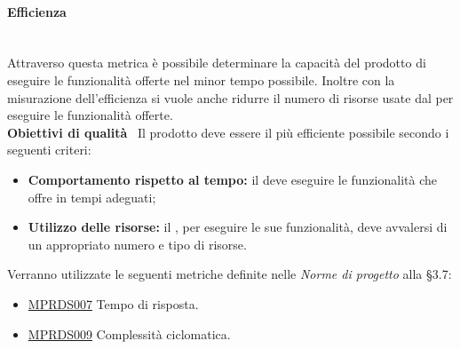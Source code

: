\paragraph{Efficienza}\mbox{}\\[0.4cm]
Attraverso questa metrica è possibile determinare la capacità del prodotto di eseguire le funzionalità offerte nel minor tempo possibile.
Inoltre con la misurazione dell'efficienza si vuole anche ridurre il numero di risorse usate dal  per eseguire le funzionalità offerte.\\[0.4cm]
\textbf{Obiettivi di qualità} \ Il prodotto deve essere il più efficiente possibile secondo i seguenti criteri:
\begin{itemize}
	\item \textbf{Comportamento rispetto al tempo:} il  deve eseguire le funzionalità che offre in tempi adeguati;
	\item \textbf{Utilizzo delle risorse:} il , per eseguire le sue funzionalità, deve avvalersi di un appropriato numero e tipo di risorse.
\end{itemize}
Verranno utilizzate le seguenti metriche definite nelle \textit{Norme di progetto} alla §3.7:
\begin{itemize}
	\item \hyperref[sec:qualita_software]{MPRDS007} Tempo di risposta.
	\item \hyperref[sec:qualita_software]{MPRDS009} Complessità ciclomatica.
\end{itemize}

